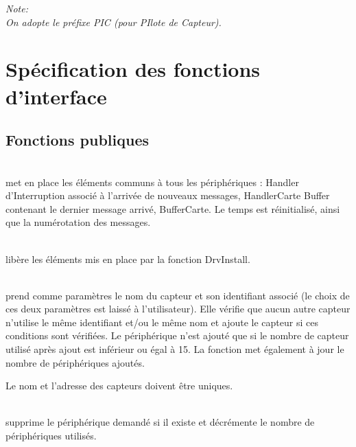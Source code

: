 
\textsl{
Note:\\
On adopte le préfixe PIC (pour PIlote de Capteur).
}

\section{Spécification des fonctions d'interface}

\subsection{Fonctions publiques}

\begin{m_desc}

 \item [PIC\_DrvInstall] \hfill\\
 met en place les éléments communs à tous les périphériques :
Handler d'Interruption associé à l'arrivée de nouveaux messages, HandlerCarte
Buffer contenant le dernier message arrivé, BufferCarte.
Le temps est réinitialisé, ainsi que la numérotation des messages.

 \item [PIC\_DrvRemove] \hfill\\
libère les éléments mis en place par la fonction DrvInstall.

 \item [PIC\_DevAdd] \hfill\\
 prend comme paramètres le nom du capteur et son identifiant associé (le choix de ces deux paramètres est laissé à l'utilisateur). Elle vérifie que aucun autre capteur n'utilise le même identifiant et/ou le même nom et ajoute le capteur si ces conditions sont vérifiées.
Le périphérique n'est ajouté que si le nombre de capteur utilisé après ajout est inférieur ou égal à 15. La fonction met également à jour le nombre de périphériques ajoutés.

Le nom et l'adresse des capteurs doivent être uniques.

 \item [PIC\_DevDelete] \hfill\\
supprime le périphérique demandé si il existe et décrémente le nombre de périphériques utilisés.

\end{m_desc}

